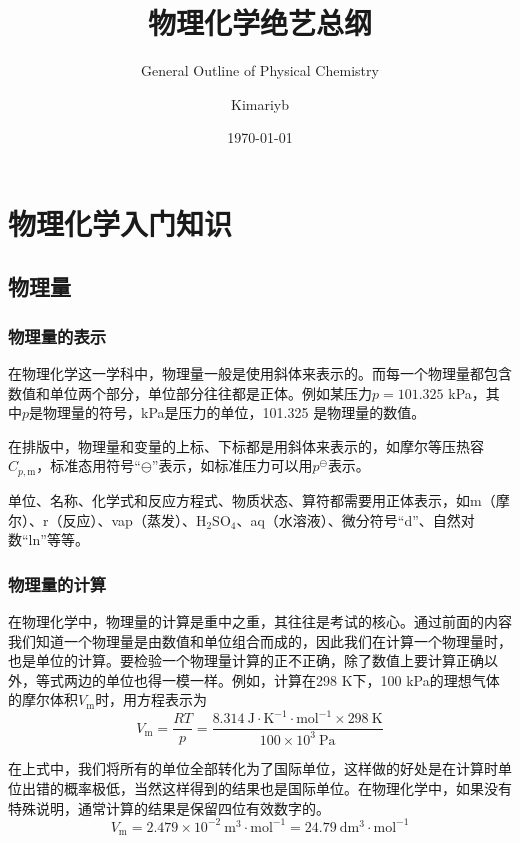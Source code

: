 \documentclass[lang=cn,newtx,10pt,scheme=chinese]{elegantbook}
\title{物理化学绝艺总纲}
\subtitle{General Outline of Physical Chemistry}
\author{Kimariyb}
\date{\today}
\begin{document}
\maketitle
\frontmatter
\tableofcontents
\mainmatter

\chapter{物理化学入门知识}

\section{物理量}
\subsection{物理量的表示}
在物理化学这一学科中，物理量一般是使用斜体来表示的。而每一个物理量都包含数值和单位两个部分，单位部分往往都是正体。例如某压力$p = 101.325$ kPa，其中$p$是物理量的符号，kPa是压力的单位，101.325 是物理量的数值。

在排版中，物理量和变量的上标、下标都是用斜体来表示的，如摩尔等压热容$C_{p,\mathrm{m}}$，标准态用符号“$\ominus$”表示，如标准压力可以用$p^\ominus$表示。

单位、名称、化学式和反应方程式、物质状态、算符都需要用正体表示，如m（摩尔）、r（反应）、vap（蒸发）、$\mathrm{H_2SO_4} $、aq（水溶液）、微分符号“d”、自然对数“ln”等等。

\subsection{物理量的计算}
在物理化学中，物理量的计算是重中之重，其往往是考试的核心。通过前面的内容我们知道一个物理量是由数值和单位组合而成的，因此我们在计算一个物理量时，也是单位的计算。要检验一个物理量计算的正不正确，除了数值上要计算正确以外，等式两边的单位也得一模一样。例如，计算在298 K下，100 kPa的理想气体的摩尔体积$V_\mathrm{m}$时，用方程表示为
\begin{equation}
V_\mathrm{m}=\frac{RT}{p}=\frac{8.314 \ \mathrm{J\cdot K^{-1}\cdot mol^{-1}} \times 298\ \mathrm{K}}{100\times 10^3\ \mathrm{Pa} }     
\end{equation}

在上式中，我们将所有的单位全部转化为了国际单位，这样做的好处是在计算时单位出错的概率极低，当然这样得到的结果也是国际单位。在物理化学中，如果没有特殊说明，通常计算的结果是保留四位有效数字的。
\begin{equation}
	V_\mathrm{m}=2.479\times 10^{-2} \ \mathrm{m^3\cdot mol^{-1}}=24.79\ \mathrm{dm^3\cdot mol^{-1}}  
\end{equation}
\end{document}
